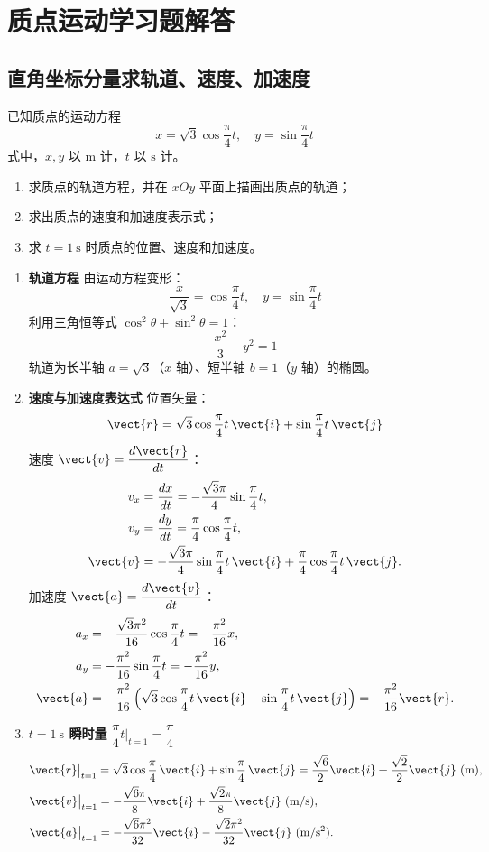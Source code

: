 \section{质点运动学习题解答}
\subsection{直角坐标分量求轨道、速度、加速度}
已知质点的运动方程
\[
x=\sqrt{3}\cos \frac{\pi}{4}t,\quad y=\sin \frac{\pi}{4}t
\]
式中，$x,y$ 以 $\mathrm{m}$ 计，$t$ 以 $\mathrm{s}$ 计。
\begin{enumerate}
    \item 求质点的轨道方程，并在 $xOy$ 平面上描画出质点的轨道；
    \item 求出质点的速度和加速度表示式；
    \item 求 $t=1\ \mathrm{s}$ 时质点的位置、速度和加速度。
\end{enumerate}
\begin{solution}
\begin{enumerate}
    \item \textbf{轨道方程}
由运动方程变形：
\[
\frac{x}{\sqrt{3}} = \cos\frac{\pi}{4}t,\quad y = \sin\frac{\pi}{4}t
\]
利用三角恒等式 $\cos^2\theta+\sin^2\theta=1$：
\[
\boxed{\frac{x^2}{3} + y^2 = 1}
\]
轨道为长半轴 $a=\sqrt{3}$（$x$ 轴）、短半轴 $b=1$（$y$ 轴）的椭圆。
    \item \textbf{速度与加速度表达式}
位置矢量：
\[
\vect{r} = \sqrt{3}\cos\frac{\pi}{4}t\,\vect{i} + \sin\frac{\pi}{4}t\,\vect{j}
\]
速度 $\vect{v}=\dfrac{d\vect{r}}{dt}$：
\[
\begin{aligned}
v_x &= \frac{dx}{dt} = -\frac{\sqrt{3}\pi}{4}\sin\frac{\pi}{4}t,\\
v_y &= \frac{dy}{dt} = \frac{\pi}{4}\cos\frac{\pi}{4}t,\\
\vect{v} &= -\frac{\sqrt{3}\pi}{4}\sin\frac{\pi}{4}t\,\vect{i} + \frac{\pi}{4}\cos\frac{\pi}{4}t\,\vect{j}.
\end{aligned}
\]
加速度 $\vect{a}=\dfrac{d\vect{v}}{dt}$：
\[
\begin{aligned}
a_x &= -\frac{\sqrt{3}\pi^2}{16}\cos\frac{\pi}{4}t = -\frac{\pi^2}{16}x,\\
a_y &= -\frac{\pi^2}{16}\sin\frac{\pi}{4}t = -\frac{\pi^2}{16}y,\\
\vect{a} &= -\frac{\pi^2}{16}\left(\sqrt{3}\cos\frac{\pi}{4}t\,\vect{i}+\sin\frac{\pi}{4}t\,\vect{j}\right)
= -\frac{\pi^2}{16}\vect{r}.
\end{aligned}
\]
    \item \textbf{$t=1\ \mathrm{s}$ 瞬时量}
$\dfrac{\pi}{4}t\big|_{t=1}=\dfrac{\pi}{4}$
\[
\begin{aligned}
&\vect{r}\big|_{t=1} = \sqrt{3}\cos\frac{\pi}{4}\,\vect{i}+\sin\frac{\pi}{4}\,\vect{j}
= \frac{\sqrt{6}}{2}\vect{i} + \frac{\sqrt{2}}{2}\vect{j}\ \mathrm{(m)},\\
&\vect{v}\big|_{t=1} = -\frac{\sqrt{6}\pi}{8}\vect{i}+\frac{\sqrt{2}\pi}{8}\vect{j}\ \mathrm{(m/s)},\\
&\vect{a}\big|_{t=1} = -\frac{\sqrt{6}\pi^2}{32}\vect{i}-\frac{\sqrt{2}\pi^2}{32}\vect{j}\ \mathrm{(m/s^2)}.
\end{aligned}
\]
\end{enumerate}
\end{solution}
